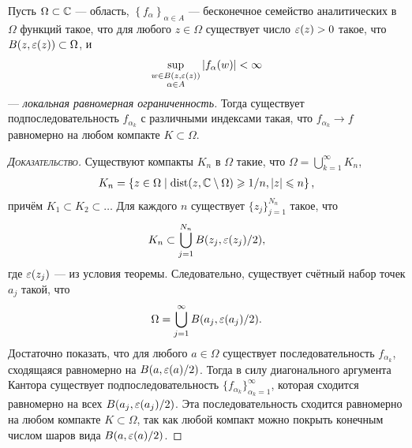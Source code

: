 \documentclass[../complex-analysis.tex]{subfiles}
\begin{document}
\begin{thm}[Монтеля]
Пусть $ \Omega \subset \mathbb{C} $ --- область, $ \left\{f_{\alpha}\right\}_{\alpha \in A}  $ --- бесконечное семейство аналитических в $ \Omega $ функций такое, что для любого $ z \in \Omega $ существует число $ \varepsilon(z) > 0 $ такое, что $ B(z, \varepsilon(z)) \subset \Omega $, и \begin{align*}
  \sup_{\substack{w \in B(z, \varepsilon(z)) \\ \alpha \in A}} \left| f_\alpha(w) \right| < \infty
 \end{align*} --- \textit{локальная равномерная ограниченность.} Тогда существует подпоследовательность $ f_{\alpha_k} $ с различными индексами такая, что $f_{\alpha_k} \to f$ равномерно на любом компакте $ K \subset \Omega $.
\end{thm}
\begin{proof}[\normalfont\textsc{Доказательство}]
 Существуют компакты $ K_n $ в $ \Omega $ такие, что $ \Omega = \bigcup_{k=1}^{\infty} K_n $,
 \begin{align*}
  K_n = \left\{ z \in \Omega \mid \mathrm{dist}(z, \mathbb{C} \setminus \Omega) \geqslant 1 / n, \left| z \right| \leqslant n \right\},
 \end{align*} причём $ K_1 \subset K_2 \subset \ldots $ Для каждого $ n $ существует $ \{z_{j}\}_{j=1}^{N_n}   $ такое, что
 \begin{align*}
  K_n \subset \bigcup_{j=1}^{N_n} B(z_j, \varepsilon(z_j) / 2),
 \end{align*} где $ \varepsilon(z_j) $ --- из условия теоремы. Следовательно, существует счётный набор точек $ a_j $ такой, что
 \begin{align*}
  \Omega = \bigcup_{j=1}^{\infty} B(a_j, \varepsilon(a_j) / 2).
 \end{align*} Достаточно показать, что для любого $ a \in \Omega $ существует последовательность $ f_{\alpha_k} $, сходящаяся равномерно на  $ B(a, \varepsilon(a) / 2) $. Тогда в силу диагонального аргумента Кантора существует подпоследовательность  $ \{f_{\alpha_k}\}_{\alpha_k=1}^{\infty}   $, которая сходится равномерно на всех $ B(a_j, \varepsilon(a_j) / 2) $. Эта последовательность сходится равномерно на любом компакте $ K \subset \Omega $, так как любой компакт можно покрыть конечным числом шаров вида $ B(a, \varepsilon(a) / 2) $.


\end{proof}
\end{document}
